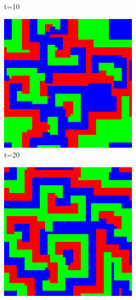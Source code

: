 \documentclass[a4paper, 11pt]{article}
\begin{document}
\begin{landscape}
\begin{figure}[H]
\begin{subfigure}{.20\textwidth}
  \caption{t=10}
\end{subfigure}%
\begin{subfigure}{.20\textwidth}
  \centering
  \includegraphics[width=0.95\linewidth]{ROCK_PAPER_SCISSORS_MOORE_50x50_HighRockPop_t20}
  \caption{t=20}
\end{subfigure}%
\begin{subfigure}{.20\textwidth}
  \centering
  \includegraphics[width=0.95\linewidth]{ROCK_PAPER_SCISSORS_MOORE_50x50_HighRockPop_t50}

\end{subfigure}
\end{figure}
\end{landscape}
\end{document}
